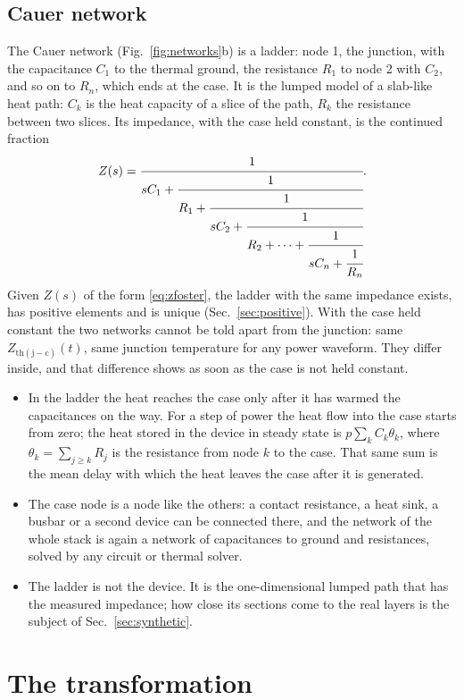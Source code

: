 \documentclass[10pt,a4paper]{scrartcl}
\newcommand{\Zjc}{Z_\mathrm{th(j-c)}}
\begin{document}
\subsection{Cauer network}
The Cauer network (Fig.~\ref{fig:networks}b) is a ladder: node 1, the junction, with the capacitance $C_1$ to the thermal ground, the resistance $R_1$ to node 2 with $C_2$, and so on to $R_n$, which ends at the case. It is the lumped model of a slab-like heat path: $C_k$ is the heat capacity of a slice of the path, $R_k$ the resistance between two slices. Its impedance, with the case held constant, is the continued fraction
\begin{equation}
Z(s) = \cfrac{1}{sC_1 + \cfrac{1}{R_1 + \cfrac{1}{sC_2 + \cfrac{1}{R_2 + \cdots + \cfrac{1}{sC_n + \cfrac{1}{R_n}}}}}} .
\label{eq:zcauer}
\end{equation}
Given $Z(s)$ of the form \eqref{eq:zfoster}, the ladder with the same impedance exists, has positive elements and is unique (Sec.~\ref{sec:positive}). With the case held constant the two networks cannot be told apart from the junction: same $\Zjc(t)$, same junction temperature for any power waveform. They differ inside, and that difference shows as soon as the case is not held constant.
\begin{itemize}
\item In the ladder the heat reaches the case only after it has warmed the capacitances on the way. For a step of power the heat flow into the case starts from zero; the heat stored in the device in steady state is $p\sum_k C_k\theta_k$, where $\theta_k = \sum_{j\geq k} R_j$ is the resistance from node $k$ to the case. That same sum is the mean delay with which the heat leaves the case after it is generated.
\item The case node is a node like the others: a contact resistance, a heat sink, a busbar or a second device can be connected there, and the network of the whole stack is again a network of capacitances to ground and resistances, solved by any circuit or thermal solver.
\item The ladder is not the device. It is the one-dimensional lumped path that has the measured impedance; how close its sections come to the real layers is the subject of Sec.~\ref{sec:synthetic}.
\end{itemize}

\section{The transformation}
\label{sec:transform}
\end{document}
